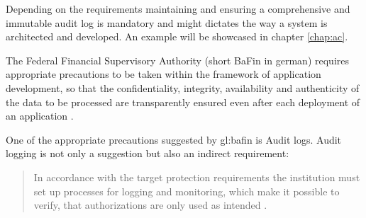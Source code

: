 Depending on the requirements maintaining and ensuring a comprehensive and immutable audit log is mandatory and might dictates the way a system is architected and developed. An example will be showcased in chapter \ref{chap:ac}.

The Federal Financial Supervisory Authority (short BaFin in german) requires appropriate precautions to be taken within the framework of application development, so that the confidentiality, integrity, availability and authenticity of the data to be processed are transparently ensured even after each deployment of an application \citep{BaFinZAIT}. 



One of the appropriate precautions suggested by \gls{gl:bafin} is Audit logs. Audit logging is not only a suggestion but also an indirect requirement:

\begin{quote}
In accordance with the target protection requirements the institution must set up processes for logging and monitoring, which make it possible to verify, that authorizations are only used as intended \citep{BaFinZAIT}.
\end{quote}



